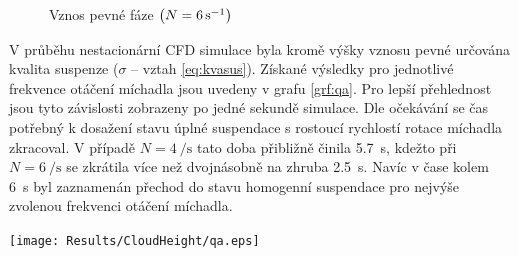 \begin{figure}[h!]
 \centering
  \qquad 
  \caption{Vznos pevné fáze $\left( N=\SI{6}{\per\second} \right)$}
  \label{fig:h-w10-6s}
\end{figure}
\newpage

V průběhu nestacionární CFD simulace byla kromě výšky vznosu pevné určována kvalita suspenze ($\sigma$ -- vztah \ref{eq:kvasus}). Získané výsledky pro jednotlivé frekvence otáčení míchadla jsou uvedeny v grafu \ref{grf:qa}. Pro lepší přehlednost jsou tyto závislosti zobrazeny po jedné sekundě simulace. Dle očekávání se čas potřebný k dosažení stavu úplné suspendace s rostoucí rychlostí rotace míchadla zkracoval. V případě $N=\SI{4}{\per\second}$ tato doba přibližně činila \SI{5.7}{\second}, kdežto při $N=\SI{6}{\per\second}$ se zkrátila více než dvojnásobně na zhruba \SI{2.5}{\second}. Navíc v čase kolem \SI{6}{\second} byl zaznamenán přechod do stavu homogenní suspendace pro nejvýše zvolenou frekvenci otáčení míchadla. 

\begin{grf}[h!]
 \centering
  \texttt{[image: Results/CloudHeight/qa.eps]}
  \caption{Průběh kvality suspenze}
  \label{grf:qa}
\end{grf}

